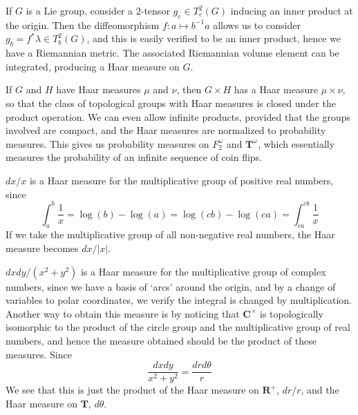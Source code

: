 \begin{example}
    If $G$ is a Lie group, consider a $2$-tensor $g_e \in T^2_e(G)$ inducing an inner product at the origin. Then the diffeomorphism $f: a \mapsto b^{-1}a$ allows us to consider $g_b = f^* \lambda \in T^2_b(G)$, and this is easily verified to be an inner product, hence we have a Riemannian metric. The associated Riemannian volume element can be integrated, producing a Haar measure on $G$.
\end{example}

\begin{example}
    If $G$ and $H$ have Haar measures $\mu$ and $\nu$, then $G \times H$ has a Haar measure $\mu \times \nu$, so that the class of topological groups with Haar measures is closed under the product operation. We can even allow infinite products, provided that the groups involved are compact, and the Haar measures are normalized to probability measures. This gives us probability measures on $F_2^\omega$ and $\mathbf{T}^\omega$, which essentially measures the probability of an infinite sequence of coin flips.
\end{example}

\begin{example}
    $dx/x$ is a Haar measure for the multiplicative group of positive real numbers, since
    \[ \int_a^b \frac{1}{x} = \log(b) - \log(a) = \log(cb) - \log(ca) = \int_{ca}^{cb} \frac{1}{x} \]
    If we take the multiplicative group of all non-negative real numbers, the Haar measure becomes $dx/|x|$.
\end{example}

\begin{example}
    $dx dy/(x^2 + y^2)$ is a Haar measure for the multiplicative group of complex numbers, since we have a basis of `arcs' around the origin, and by a change of variables to polar coordinates, we verify the integral is changed by multiplication. Another way to obtain this measure is by noticing that $\mathbf{C}^\times$ is topologically isomorphic to the product of the circle group and the multiplicative group of real numbers, and hence the measure obtained should be the product of these measures. Since
    \[ \frac{dx dy}{x^2 + y^2} = \frac{dr d\theta}{r} \]
    We see that this is just the product of the Haar measure on $\mathbf{R}^+$, $dr/r$, and the Haar measure on $\mathbf{T}$, $d \theta$.
\end{example}

